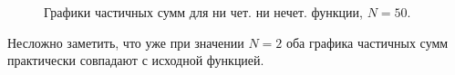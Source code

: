 \documentclass[a5paper, 10pt]{article}
\theoremstyle{definition}
\theoremstyle{plain}
\theoremstyle{remark}
\begin{document}
\begin{figure}[h]
\begin{minipage}[h]{0.5\linewidth}
\end{minipage}
\hfill
\begin{minipage}[h]{0.5\linewidth}
\end{minipage}
\caption{Графики частичных сумм для ни чет. ни нечет. функции, $N=50$.}
\end{figure}

Несложно заметить, что уже при значении $N=2$ оба графика частичных сумм практически совпадают с исходной функцией.
\end{document}
